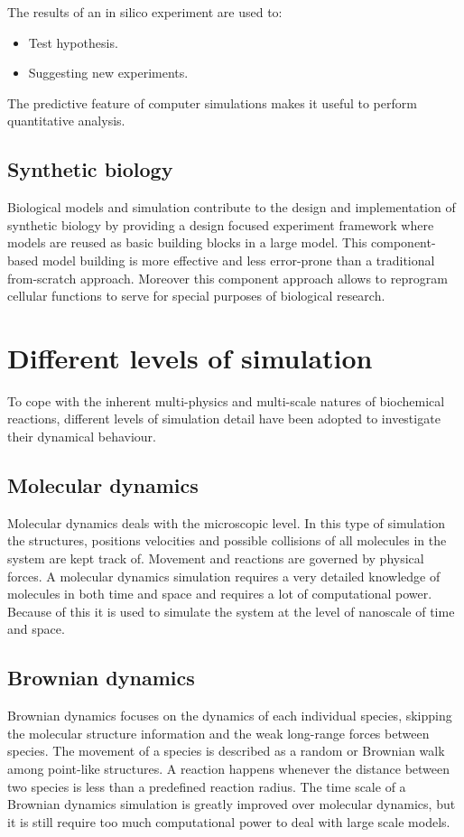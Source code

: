     The results of an in silico experiment are used to:

    \begin{multicols}{2}
      \begin{itemize}
        \item Test hypothesis.
        \item Suggesting new experiments.
      \end{itemize}
    \end{multicols}

    The predictive feature of computer simulations makes it useful to perform quantitative analysis.

  \subsection{Synthetic biology}
  Biological models and simulation contribute to the design and implementation of synthetic biology by providing a design focused experiment framework where models are reused as basic building blocks in a large model.
  This component-based model building is more effective and less error-prone than a traditional from-scratch approach.
  Moreover this component approach allows to reprogram cellular functions to serve for special purposes of biological research.

\section{Different levels of simulation}
To cope with the inherent multi-physics and multi-scale natures of biochemical reactions, different levels of simulation detail have been adopted to investigate their dynamical behaviour.

  \subsection{Molecular dynamics}
  Molecular dynamics deals with the microscopic level.
  In this type of simulation the structures, positions velocities and possible collisions of all molecules in the system are kept track of.
  Movement and reactions are governed by physical forces.
  A molecular dynamics simulation requires a very detailed knowledge of molecules in both time and space and requires a lot of computational power.
  Because of this it is used to simulate the system at the level of nanoscale of time and space.

  \subsection{Brownian dynamics}
  Brownian dynamics focuses on the dynamics of each individual species, skipping the molecular structure information and the weak long-range forces between species.
  The movement of a species is described as a random or Brownian walk among point-like structures.
  A reaction happens whenever the distance between two species is less than a predefined reaction radius.
  The time scale of a Brownian dynamics simulation is greatly improved over molecular dynamics, but it is still require too much computational power to deal with large scale models.

